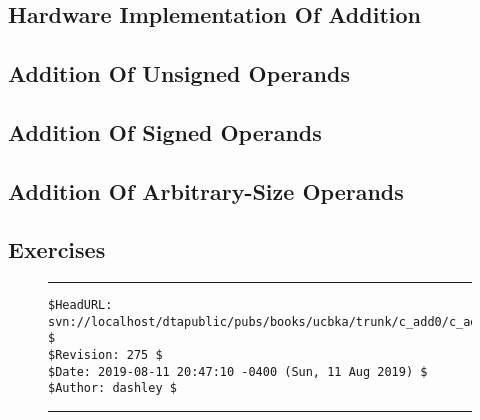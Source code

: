 
\chapter{\caddzerolongtitle{}}

\label{cadd0}

\section{Hardware Implementation Of Addition}

\section{Addition Of Unsigned Operands}

\section{Addition Of Signed Operands}

\section{Addition Of Arbitrary-Size Operands}

\section{Exercises}



\noindent\begin{figure}[!b]
\noindent\rule[-0.25in]{\textwidth}{1pt}
\begin{tiny}
\begin{verbatim}
$HeadURL: svn://localhost/dtapublic/pubs/books/ucbka/trunk/c_add0/c_add0.tex $
$Revision: 275 $
$Date: 2019-08-11 20:47:10 -0400 (Sun, 11 Aug 2019) $
$Author: dashley $
\end{verbatim}
\end{tiny}
\noindent\rule[0.25in]{\textwidth}{1pt}
\end{figure}

%
